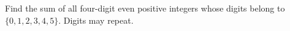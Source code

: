 Find the sum of all four-digit even positive integers whose digits belong to $\{0,1,2,3,4,5\}$. Digits may repeat.
